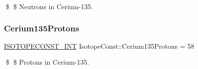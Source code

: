 \$ \$ Neutrons in Cerium-\/135. \mbox{\label{group___isotope_const-_cerium-_ce135_gab42e234374aeb291ce0ec2e48056d54c}} 
\subsubsection{\texorpdfstring{Cerium135\+Protons}{Cerium135Protons}}
{\footnotesize\ttfamily \mbox{\hyperlink{group___isotope_const-_macros_ga5f18360b3e99483a35c32d789e62621c}{I\+S\+O\+T\+O\+P\+E\+C\+O\+N\+S\+T\+\_\+\+I\+NT}} Isotope\+Const\+::\+Cerium135\+Protons = 58}

\$ \$ Protons in Cerium-\/135. 